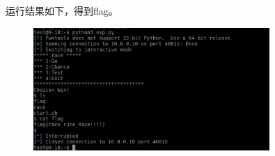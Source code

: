\documentclass{article}
\begin{document}
    运行结果如下，得到flag。
    \begin{figure}[H]
    	\begin{center}
    		\includegraphics[width=0.8\textwidth]{1.png}
    	\end{center}
    \end{figure}
 
   
   
   
 
\end{document}

